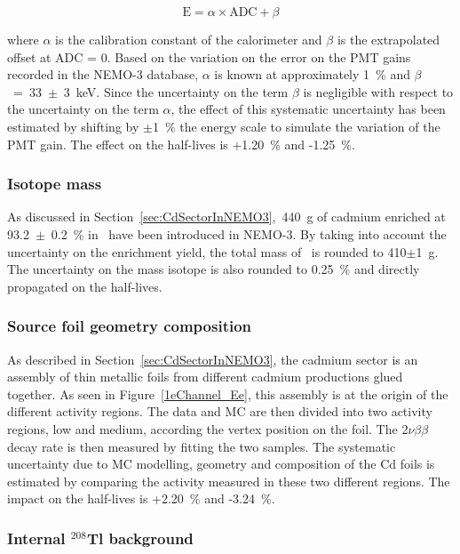 \documentclass[main.tex]{subfiles}
\begin{document}
\begin{equation}
\text{E} = \alpha \times \text{ADC} + \beta
\end{equation} 


\NI where $\alpha$ is the calibration constant of the calorimeter and $\beta$ is the extrapolated offset at ADC = 0. Based on the variation on the error on the PMT gains recorded in the NEMO-3 database, $\alpha$ is known at approximately 1~\% and $\beta$~=~33~$\pm$~3~keV. Since the uncertainty on the term $\beta$ is negligible with respect to the uncertainty on the term $\alpha$, the effect of this systematic uncertainty has been estimated by shifting by $\pm$1~\% the energy scale to simulate the variation of the PMT gain. The effect on the half-lives is +1.20~\% and -1.25~\%.   


\subsubsection{Isotope mass}


\NI As discussed in Section~\ref{sec:CdSectorInNEMO3},~440~g of cadmium enriched at 93.2~$\pm$~0.2~\% in \Cd~have been introduced in NEMO-3. By taking into account the uncertainty on the enrichment yield, the total mass of \Cd ~is rounded to 410$\pm$1~g. The uncertainty on the mass isotope is also rounded to 0.25~\% and directly propagated on the half-lives. 


\subsubsection{Source foil geometry composition}


\NI As described in Section~\ref{sec:CdSectorInNEMO3}, the cadmium sector is an assembly of thin metallic foils from different cadmium productions glued together. As seen in Figure~\ref{1eChannel_Ee}, this assembly is at the origin of the different activity regions. The data and MC are then divided into two activity regions, low and medium, according the vertex position on the foil. The 2$\nu\beta\beta$ decay rate is then measured by fitting the two samples. The systematic uncertainty due to MC modelling, geometry and composition of the Cd foils is estimated by comparing the activity measured in these two different regions. The impact on the half-lives is +2.20~\% and -3.24~\%.


\subsubsection{Internal $^{\text{208}}$Tl background}
\end{document}
